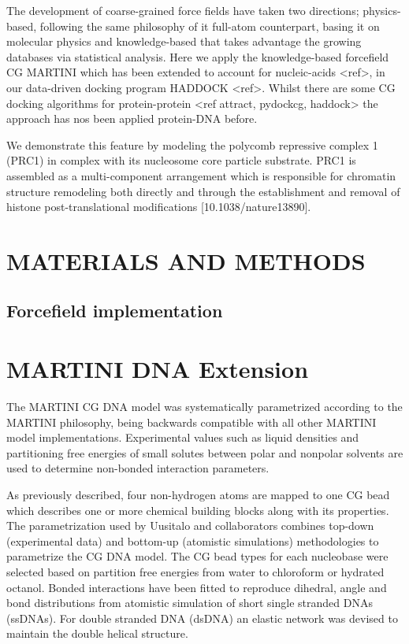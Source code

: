 \documentclass[a4,center,fleqn]{NAR}
\begin{document}

The development of coarse-grained force fields have taken two directions; physics-based, following the same philosophy of it full-atom counterpart, basing it on molecular physics and knowledge-based that takes advantage the growing databases via statistical analysis. Here we apply the knowledge-based forcefield CG MARTINI \cite{Marrink2007} which has been extended to account for nucleic-acids <ref>, in our data-driven docking program HADDOCK <ref>. Whilst there are some CG docking algorithms for protein-protein <ref attract, pydockcg, haddock> the approach has nos been applied protein-DNA before.

We demonstrate this feature by modeling the polycomb repressive complex 1 (PRC1) in complex with its nucleosome core particle substrate. PRC1 is assembled as a multi-component arrangement which is responsible for chromatin structure remodeling both directly and through the establishment and removal of histone post-translational modifications [10.1038/nature13890].

\enlargethispage{-65.1pt}


\section{MATERIALS AND METHODS}

\subsection{Forcefield implementation}


\section{MARTINI DNA Extension}

The MARTINI CG DNA model was systematically parametrized according to the MARTINI philosophy, being backwards compatible with all other MARTINI model implementations. Experimental values such as liquid densities and partitioning free energies of small solutes between polar and nonpolar solvents are used to determine non-bonded interaction parameters\cite{Uusitalo2015}.

As previously described, four non-hydrogen atoms are mapped to one CG bead which describes one or more chemical building blocks along with its properties. The parametrization used by Uusitalo and collaborators combines top-down (experimental data) and bottom-up (atomistic simulations) methodologies to parametrize the CG DNA model. The CG bead types for each nucleobase were selected based on partition free energies from water to chloroform or hydrated octanol. Bonded interactions have been fitted to reproduce dihedral, angle and bond distributions from atomistic simulation of short single stranded DNAs (ssDNAs). For double stranded DNA (dsDNA) an elastic network was devised to maintain the double helical structure.
\end{document}
